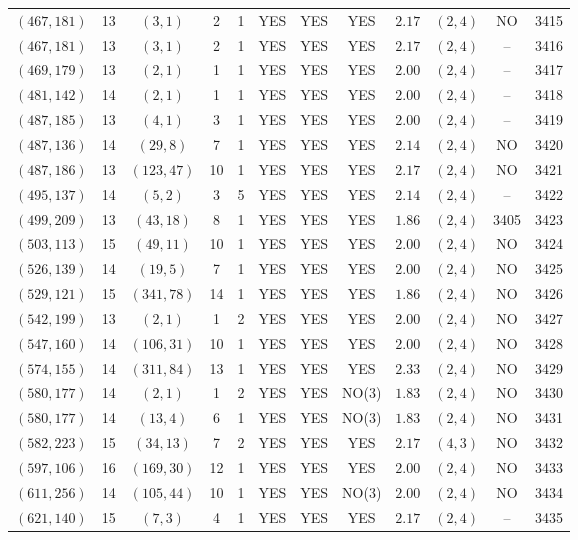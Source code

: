 \begin{longtable}{|c|c|c|c|c|c|c|c|c|c|c|c|}
$(467,181)$ & 13 & $(3,1)$ & 2 & 1 & YES & YES & YES & $2.17$ & $(2,4)$ & NO & 3415\\
$(467,181)$ & 13 & $(3,1)$ & 2 & 1 & YES & YES & YES & $2.17$ & $(2,4)$ & -- & 3416\\
$(469,179)$ & 13 & $(2,1)$ & 1 & 1 & YES & YES & YES & $2.00$ & $(2,4)$ & -- & 3417\\
$(481,142)$ & 14 & $(2,1)$ & 1 & 1 & YES & YES & YES & $2.00$ & $(2,4)$ & -- & 3418\\
$(487,185)$ & 13 & $(4,1)$ & 3 & 1 & YES & YES & YES & $2.00$ & $(2,4)$ & -- & 3419\\
$(487,136)$ & 14 & $(29,8)$ & 7 & 1 & YES & YES & YES & $2.14$ & $(2,4)$ & NO & 3420\\
$(487,186)$ & 13 & $(123,47)$ & 10 & 1 & YES & YES & YES & $2.17$ & $(2,4)$ & NO & 3421\\
$(495,137)$ & 14 & $(5,2)$ & 3 & 5 & YES & YES & YES & $2.14$ & $(2,4)$ & -- & 3422\\
$(499,209)$ & 13 & $(43,18)$ & 8 & 1 & YES & YES & YES & $1.86$ & $(2,4)$ & 3405 & 3423\\
$(503,113)$ & 15 & $(49,11)$ & 10 & 1 & YES & YES & YES & $2.00$ & $(2,4)$ & NO & 3424\\
$(526,139)$ & 14 & $(19,5)$ & 7 & 1 & YES & YES & YES & $2.00$ & $(2,4)$ & NO & 3425\\
$(529,121)$ & 15 & $(341,78)$ & 14 & 1 & YES & YES & YES & $1.86$ & $(2,4)$ & NO & 3426\\
$(542,199)$ & 13 & $(2,1)$ & 1 & 2 & YES & YES & YES & $2.00$ & $(2,4)$ & NO & 3427\\
$(547,160)$ & 14 & $(106,31)$ & 10 & 1 & YES & YES & YES & $2.00$ & $(2,4)$ & NO & 3428\\
$(574,155)$ & 14 & $(311,84)$ & 13 & 1 & YES & YES & YES & $2.33$ & $(2,4)$ & NO & 3429\\
$(580,177)$ & 14 & $(2,1)$ & 1 & 2 & YES & YES & NO(3) & $1.83$ & $(2,4)$ & NO & 3430\\
$(580,177)$ & 14 & $(13,4)$ & 6 & 1 & YES & YES & NO(3) & $1.83$ & $(2,4)$ & NO & 3431\\
$(582,223)$ & 15 & $(34,13)$ & 7 & 2 & YES & YES & YES & $2.17$ & $(4,3)$ & NO & 3432\\
$(597,106)$ & 16 & $(169,30)$ & 12 & 1 & YES & YES & YES & $2.00$ & $(2,4)$ & NO & 3433\\
$(611,256)$ & 14 & $(105,44)$ & 10 & 1 & YES & YES & NO(3) & $2.00$ & $(2,4)$ & NO & 3434\\
$(621,140)$ & 15 & $(7,3)$ & 4 & 1 & YES & YES & YES & $2.17$ & $(2,4)$ & -- & 3435\\

\end{longtable}
